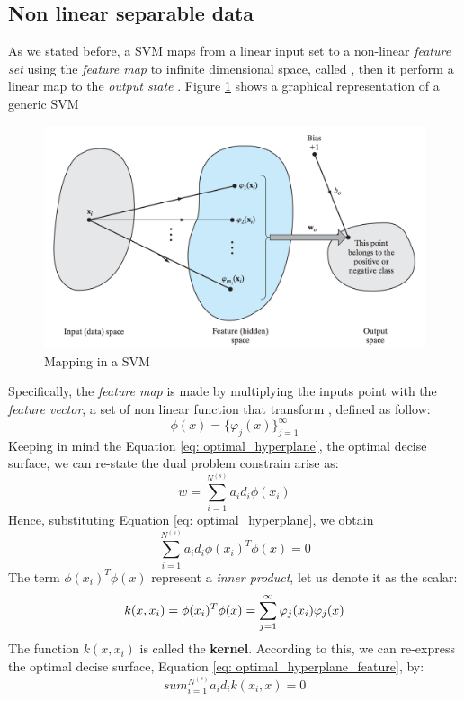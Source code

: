 \documentclass[11pt]{article}
\begin{document}
\subsection{Non linear separable data}
As we stated before, a SVM maps from a linear input set to a non-linear \emph{feature set} using the  \emph{feature map} to infinite dimensional space, called , then it perform a linear map to the \emph{output state} . Figure \ref{fig: SVM} shows a graphical representation of a generic SVM
\begin{figure}[H]
\centering
\includegraphics[scale=0.3]{images/SVM}
\caption{Mapping in a SVM}
\label{fig: SVM}
\end{figure}
Specifically, the \emph{feature map} is made by multiplying the inputs point with the \emph{feature vector}, a set of non linear function that transform , defined as follow:
\begin{equation}
\phi(x) = \{\varphi_j(x) \}^{\infty}_{j=1}
\label{eq: feature_map}
\end{equation}
Keeping in mind the Equation \ref{eq: optimal_hyperplane}, the optimal decise surface, we can re-state the dual problem constrain arise as:
\begin{equation}
w = \sum^{N^{(s)}}_{i = 1}a_id_i\phi(x_i)	
\end{equation}
Hence, substituting Equation \ref{eq: optimal_hyperplane}, we obtain
\begin{equation}
\sum^{N^{(s)}}_{i = 1}a_id_i\phi(x_i)^T\phi(x) = 0
\label{eq: optimal_hyperplane_feature}
\end{equation}
The term $\phi(x_i)^T\phi(x)$ represent a \emph{inner product}, let us denote it as the scalar:
\begin{equation}
\label{eq: kernel}
k(x, x_i) = \phi(x_i)^T\phi(x)  \\
= \sum^{\infty}_{j=1} \varphi_j(x_i)\varphi_j(x)
\end{equation}
The function $k(x, x_i)$ is called the \textbf{kernel}. According to this, we can re-express the optimal decise surface, Equation \ref{eq: optimal_hyperplane_feature}, by:
\begin{equation}
sum^{N^{(s)}}_{i = 1}a_id_ik(x_i,x) = 0
\label{eq: optimal_hyperplane_feature}
\end{equation} 
\end{document}
